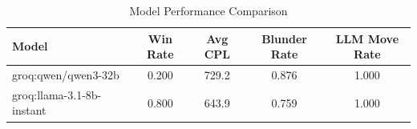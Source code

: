 \begin{table}[h]
\centering
\caption{Model Performance Comparison}
\begin{tabular}{lcccc}
\toprule
Model & Win Rate & Avg CPL & Blunder Rate & LLM Move Rate \\
\midrule
groq:qwen/qwen3-32b & 0.200 & 729.2 & 0.876 & 1.000 \\
groq:llama-3.1-8b-instant & 0.800 & 643.9 & 0.759 & 1.000 \\
\bottomrule
\end{tabular}
\end{table}